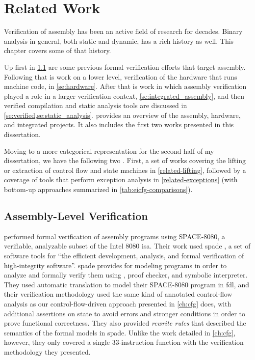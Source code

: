 \chapter{Related Work}\label{ch:related}
Verification of assembly has been an active field of research for decades.
Binary analysis in general, both static and dynamic, has a rich history as well.
This chapter covers some of that history.

Up first in \cref{se:previous_assembly}
are some previous formal verification efforts that target assembly.
Following that is work on a lower level,
verification of the hardware that runs machine code, in \cref{se:hardware}.
After that is work in which assembly verification played a role
in a larger verification context, \cref{se:integrated_assembly},
and then verified compilation and static analysis tools are discussed
in \cref{se:verified,se:static_analysis}.
 provides an overview of the assembly,
hardware, and integrated projects.
It also includes the first two works presented in this dissertation.

Moving to a more categorical representation for the second half of my dissertation, we have the following two .
First, a set of works covering the lifting or extraction of control flow and state machines in \cref{related-lifting}, followed by a coverage of tools that perform exception analysis in \cref{related-exceptions} (with bottom-up approaches summarized in \cref{tab:eicfg-comparisons}).

\section{Assembly-Level Verification}\label{se:previous_assembly}
\Textcite{clutterbuck1986validation,clutterbuck1988verification} performed formal verification
of assembly programs using SPACE-8080, a verifiable,
analyzable subset of the Intel 8080 \ac{isa}.
Their work used \ac{spade} \autocite{carre1986spade}, a set of software tools for ``the efficient development, analysis, and formal verification of high-integrity software''.
\Ac{spade} provides  for modeling programs
in order to analyze and formally verify them
using , proof checker, and symbolic interpreter.
They used automatic translation to model their SPACE-8080 program
in \ac{fdl}, and their verification methodology used the same kind of
annotated control-flow analysis as our control-flow-driven approach
presented in \cref{ch:cfg} does, with additional assertions on state to avoid errors
and stronger conditions in order to prove functional correctness.
They also provided \emph{rewrite rules} that described the semantics
of the formal models in \ac{spade}. Unlike the work detailed in \cref{ch:cfg}, however,
they only covered a single 33-instruction function
with the verification methodology they presented.

